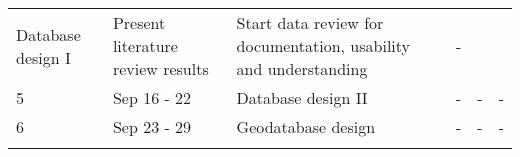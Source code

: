 \documentclass[
]{article}
\begin{document}
\begin{longtable}[]{@{}llllll@{}}
\begin{minipage}[t]{0.18\columnwidth}
Database design I\strut
\end{minipage} & \begin{minipage}[t]{0.18\columnwidth}\raggedright
Present literature review results\strut
\end{minipage} & \begin{minipage}[t]{0.14\columnwidth}\raggedright
Start data review for documentation, usability and understanding\strut
\end{minipage} & \begin{minipage}[t]{0.17\columnwidth}\raggedright
-\strut
\end{minipage}\tabularnewline
\begin{minipage}[t]{0.05\columnwidth}\raggedright
5\strut
\end{minipage} & \begin{minipage}[t]{0.11\columnwidth}\raggedright
Sep 16 - 22\strut
\end{minipage} & \begin{minipage}[t]{0.18\columnwidth}\raggedright
Database design II\strut
\end{minipage} & \begin{minipage}[t]{0.18\columnwidth}\raggedright
-\strut
\end{minipage} & \begin{minipage}[t]{0.14\columnwidth}\raggedright
-\strut
\end{minipage} & \begin{minipage}[t]{0.17\columnwidth}\raggedright
-\strut
\end{minipage}\tabularnewline
\begin{minipage}[t]{0.05\columnwidth}\raggedright
6\strut
\end{minipage} & \begin{minipage}[t]{0.11\columnwidth}\raggedright
Sep 23 - 29\strut
\end{minipage} & \begin{minipage}[t]{0.18\columnwidth}\raggedright
Geodatabase design\strut
\end{minipage} & \begin{minipage}[t]{0.18\columnwidth}\raggedright
-\strut
\end{minipage} & \begin{minipage}[t]{0.14\columnwidth}\raggedright
-\strut
\end{minipage} & \begin{minipage}[t]{0.17\columnwidth}\raggedright
-\strut
\end{minipage}\tabularnewline
\begin{minipage}[t]{0.05\columnwidth}\raggedright

\end{minipage}
\end{longtable}
\end{document}

